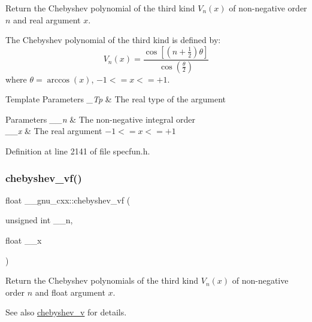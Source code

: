Return the Chebyshev polynomial of the third kind $ V_n(x) $ of non-\/negative order $ n $ and real argument $ x $.

The Chebyshev polynomial of the third kind is defined by\+: \[ V_n(x) = \frac{\cos \left[ \left(n+\frac{1}{2}\right)\theta \right]} {\cos \left(\frac{\theta}{2}\right)} \] where $ \theta = \arccos(x) $, $ -1 <= x <= +1 $.


\begin{DoxyTemplParams}{Template Parameters}
{\em \+\_\+\+Tp} & The real type of the argument \\
\hline
\end{DoxyTemplParams}

\begin{DoxyParams}{Parameters}
{\em \+\_\+\+\_\+n} & The non-\/negative integral order \\
\hline
{\em \+\_\+\+\_\+x} & The real argument $ -1 <= x <= +1 $ \\
\hline
\end{DoxyParams}


Definition at line 2141 of file specfun.\+h.

\mbox{\label{group__gnu__math__spec__func_gaa9635a0da4bdeaa8060ae5cf03c3a12d}} 
\subsubsection{\texorpdfstring{chebyshev\+\_\+vf()}{chebyshev\_vf()}}
{\footnotesize\ttfamily float \+\_\+\+\_\+gnu\+\_\+cxx\+::chebyshev\+\_\+vf (\begin{DoxyParamCaption}\item[{unsigned int}]{\+\_\+\+\_\+n,  }\item[{float}]{\+\_\+\+\_\+x }\end{DoxyParamCaption})\hspace{0.3cm}{\ttfamily [inline]}}

Return the Chebyshev polynomials of the third kind $ V_n(x) $ of non-\/negative order $ n $ and {\ttfamily float} argument $ x $.

\begin{DoxySeeAlso}{See also}
\hyperlink{group__gnu__math__spec__func_ga32b7decd0002f542d2c9187c5f0846c6}{chebyshev\+\_\+v} for details. 
\end{DoxySeeAlso}


